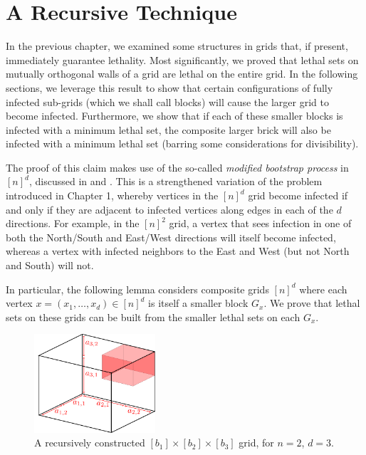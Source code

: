 \chapter{A Recursive Technique}

In the previous chapter, we examined some structures in grids that, if present, immediately guarantee lethality. Most significantly, we proved that lethal sets on mutually orthogonal walls of a grid are lethal on the entire grid. In the following sections, we leverage this result to show that certain configurations of fully infected sub-grids (which we shall call blocks) will cause the larger grid to become infected. Furthermore, we show that if each of these smaller blocks is infected with a minimum lethal set, the composite larger brick will also be infected with a minimum lethal set (barring some considerations for divisibility).

The proof of this claim makes use of the so-called \emph{modified bootstrap process} in $[n]^d$, discussed in \cite{some paper} and \cite{some other paper}. This is a strengthened variation of the problem introduced in Chapter 1, whereby vertices in the $[n]^d$ grid become infected if and only if they are adjacent to infected vertices along edges in each of the $d$ directions. For example, in the $[n]^2$ grid, a vertex that sees infection in one of both the North/South and East/West directions will itself become infected, whereas a vertex with infected neighbors to the East and West (but not North and South) will not. 

In particular, the following lemma considers composite grids $[n]^d$ where each vertex $x = (x_1, \dots, x_d) \in [n]^d$ is itself a smaller block $G_x$. We prove that lethal sets on these grids can be built from the smaller lethal sets on each $G_x$. 

\begin{figure}[]
\centering
\includegraphics[width=0.4\textwidth]{figures/3/recursion.pdf}
\caption{A recursively constructed $[b_1] \times [b_2] \times [b_3]$ grid, for $n = 2$, $d = 3$.}
\label{fig:recursion}
\end{figure} 

